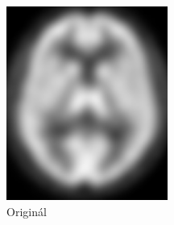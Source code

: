     \begin{figure}[htp]
        \center
        \begin{minipage}[c]{0.5\textwidth}
            \center
            \includegraphics[width = 150pt]{src/8Appendix/final/original.png}
            \caption{Originál}
        \end{minipage}
     \end{figure}
